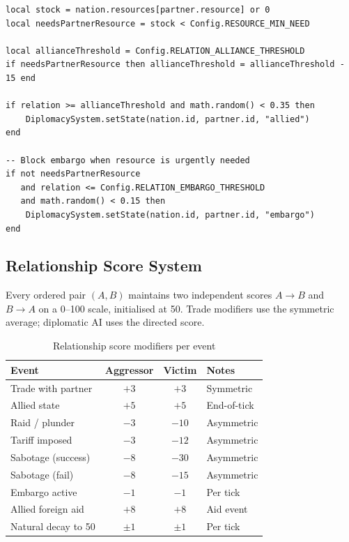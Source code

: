 \documentclass[12pt,a4paper]{article}
\begin{document}
\begin{lstlisting}[caption={Resource-dependency alliance logic --- DiplomacySystem.lua}]
local stock = nation.resources[partner.resource] or 0
local needsPartnerResource = stock < Config.RESOURCE_MIN_NEED

local allianceThreshold = Config.RELATION_ALLIANCE_THRESHOLD
if needsPartnerResource then allianceThreshold = allianceThreshold - 15 end

if relation >= allianceThreshold and math.random() < 0.35 then
    DiplomacySystem.setState(nation.id, partner.id, "allied")
end

-- Block embargo when resource is urgently needed
if not needsPartnerResource
   and relation <= Config.RELATION_EMBARGO_THRESHOLD
   and math.random() < 0.15 then
    DiplomacySystem.setState(nation.id, partner.id, "embargo")
end
\end{lstlisting}

\subsection{Relationship Score System}

Every ordered pair $(A, B)$ maintains two independent scores $A \to B$ and $B \to A$ on a 0--100 scale, initialised at 50. Trade modifiers use the symmetric average; diplomatic AI uses the directed score.

\begin{table}[h]
\centering
\caption{Relationship score modifiers per event}
\begin{tabular}{|l|c|c|l|}
\hline
\textbf{Event} & \textbf{Aggressor} & \textbf{Victim} & \textbf{Notes} \\
\hline
Trade with partner     & $+3$   & $+3$  & Symmetric \\
Allied state           & $+5$   & $+5$  & End-of-tick \\
Raid / plunder         & $-3$   & $-10$ & Asymmetric \\
Tariff imposed         & $-3$   & $-12$ & Asymmetric \\
Sabotage (success)     & $-8$   & $-30$ & Asymmetric \\
Sabotage (fail)        & $-8$   & $-15$ & Asymmetric \\
Embargo active         & $-1$   & $-1$  & Per tick \\
Allied foreign aid     & $+8$   & $+8$  & Aid event \\
Natural decay to 50    & $\pm1$ & $\pm1$& Per tick \\
\hline
\end{tabular}
\end{table}
\end{document}
